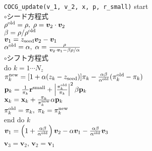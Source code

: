 \documentclass[12pt,titlepage]{jarticle}
\renewenvironment{leftbar}{%
  \def\FrameCommand{\vrule width 1pt \hspace{0pt}}%
  \MakeFramed {\advance\hsize-\width \FrameRestore}}%
 {\endMakeFramed}
\begin{document}
\begin{leftbar}
  \noindent
  \hspace{0.5cm}
  \verb|COCG_update(v_1, v_2, x, p, r_small)| start
  \\\hspace{1.0cm}
  $\circ$シード方程式
  \\\hspace{1.0cm}
  $\rho^{\rm old} = \rho,\; \rho = {\boldsymbol v}_2 \cdot {\boldsymbol v}_2$
  \\\hspace{1.0cm}
  $\beta = \rho / \rho^{\rm old}$
  \\\hspace{1.0cm}
  ${\boldsymbol v}_1 = z_{\rm seed} {\boldsymbol v}_2 - {\boldsymbol v}_1$
  \\\hspace{1.0cm}
  $\alpha^{\rm old} = \alpha,\; 
  \alpha = \frac{\rho}{{\boldsymbol v}_2 \cdot {\boldsymbol v}_1 - \beta \rho / \alpha }$
  \\\hspace{1.0cm}
  $\circ$シフト方程式
  \\\hspace{1.0cm}
  do $k = 1 \cdots N_z$
  \\\hspace{1.5cm}
  $\pi_k^{\rm new} = [1+\alpha(z_k-z_{\rm seed})]\pi_k - \frac{\alpha \beta}{\alpha^{\rm old}}(\pi_k^{\rm old} - \pi_k)$
  \\\hspace{1.5cm}
  ${\bf p}_{k} = \frac{1}{\pi_k} {\bf r}^{\rm small} + 
  \left|\frac{\pi^{\rm old}_k}{\pi_k } \right|^2 \beta {\bf p}_{k}$
  \\\hspace{1.5cm}
  ${\bf x}_{k} = {\bf x}_{k} + \frac{\pi_k}{\pi_k^{\rm new}} \alpha {\bf p}_{k}$
  \\\hspace{1.5cm}
  $\pi_k^{\rm old} = \pi_k,\; \pi_k = \pi_k^{\rm new}$
  \\\hspace{1.0cm}
  end do $k$
  \\\hspace{1.0cm}
  ${\boldsymbol v}_1 = \left( 1 + \frac{\alpha \beta}{\alpha^{\rm old}} \right) {\boldsymbol v}_2
  - \alpha {\boldsymbol v}_1 - \frac{\alpha \beta}{\alpha^{\rm old}} {\boldsymbol v}_3$
  \\\hspace{1.0cm}
  ${\boldsymbol v}_3 = {\boldsymbol v}_2$,
  ${\boldsymbol v}_2 = {\boldsymbol v}_1$

\end{leftbar}
\end{document}
